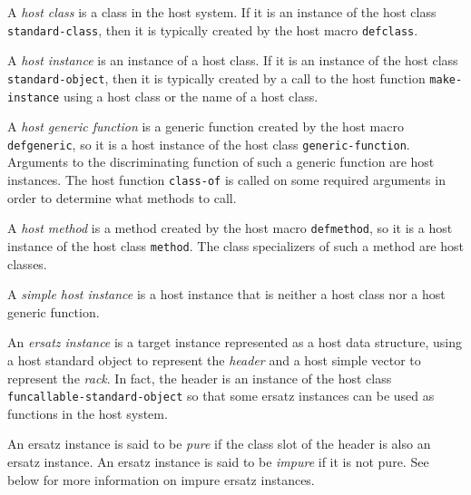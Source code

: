 \begin{definition}
A \emph{host class} is a class in the host system.  If it is an
instance of the host class \texttt{standard-class}, then it is
typically created by the host macro \texttt{defclass}.
\end{definition}

\begin{definition}
A \emph{host instance} is an instance of a host class.  If it is an
instance of the host class \texttt{standard-object}, then it is
typically created by a call to the host function
\texttt{make-instance} using a host class or the name of a host class.
\end{definition}

\begin{definition}
A \emph{host generic function} is a generic function created by the
host macro \texttt{defgeneric}, so it is a host instance of the host
class \texttt{generic-function}.  Arguments to the discriminating
function of such a generic function are host instances.  The host
function \texttt{class-of} is called on some required arguments in
order to determine what methods to call.
\end{definition}

\begin{definition}
A \emph{host method} is a method created by the host macro
\texttt{defmethod}, so it is a host instance of the host class
\texttt{method}.  The class specializers of such a method are host
classes.
\end{definition}

\begin{definition}
A \emph{simple host instance} is a host instance that is neither a
host class nor a host generic function.
\end{definition}

\begin{definition}
An \emph{ersatz instance} is a target instance represented as a host
data structure, using a host standard object to represent the
\emph{header} and a host simple vector to represent the \emph{rack}.
In fact, the header is an instance of the host class
\texttt{funcallable-standard-object} so that some ersatz instances can
be used as functions in the host system.
\end{definition}

\begin{definition}
An ersatz instance is said to be \emph{pure} if the class slot of the
header is also an ersatz instance.  An ersatz instance is said to be
\emph{impure} if it is not pure.  See below for more information on
impure ersatz instances.
\end{definition}

